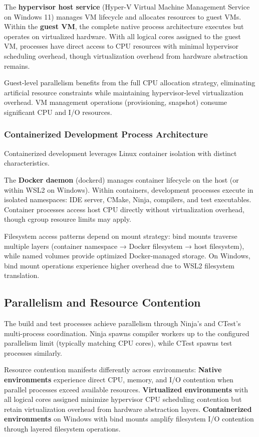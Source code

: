 The \textbf{hypervisor host service} (Hyper-V Virtual Machine Management Service on Windows 11) manages VM lifecycle and allocates resources to guest VMs.
Within the \textbf{guest VM}, the complete native process architecture executes but operates on virtualized hardware.
With all logical cores assigned to the guest VM, processes have direct access to CPU resources with minimal hypervisor scheduling overhead, though virtualization overhead from hardware abstraction remains.

Guest-level parallelism benefits from the full CPU allocation strategy, eliminating artificial resource constraints while maintaining hypervisor-level virtualization overhead.
VM management operations (provisioning, snapshot) consume significant CPU and I/O resources.

\subsubsection{Containerized Development Process Architecture}

Containerized development leverages Linux container isolation with distinct characteristics.

The \textbf{Docker daemon} (dockerd) manages container lifecycle on the host (or within WSL2 on Windows).
Within containers, development processes execute in isolated namespaces: IDE server, CMake, Ninja, compilers, and test executables.
Container processes access host CPU directly without virtualization overhead, though cgroup resource limits may apply.

Filesystem access patterns depend on mount strategy: bind mounts traverse multiple layers (container namespace → Docker filesystem → host filesystem), while named volumes provide optimized Docker-managed storage.
On Windows, bind mount operations experience higher overhead due to WSL2 filesystem translation.

\subsection{Parallelism and Resource Contention}

The build and test processes achieve parallelism through Ninja's and CTest's multi-process coordination.
Ninja spawns compiler workers up to the configured parallelism limit (typically matching CPU cores), while CTest spawns test processes similarly.

Resource contention manifests differently across environments:
\textbf{Native environments} experience direct CPU, memory, and I/O contention when parallel processes exceed available resources.
\textbf{Virtualized environments} with all logical cores assigned minimize hypervisor CPU scheduling contention but retain virtualization overhead from hardware abstraction layers.
\textbf{Containerized environments} on Windows with bind mounts amplify filesystem I/O contention through layered filesystem operations.

